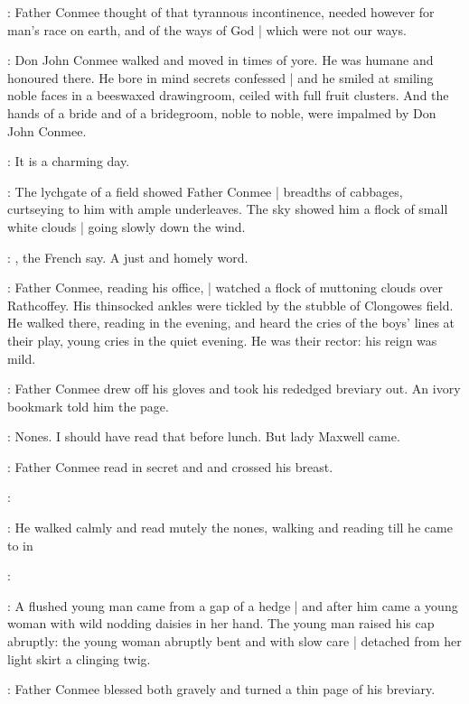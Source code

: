 :
Father Conmee thought of that tyrannous incontinence,
needed however for man's race on earth,
and of the ways of God |
which were not our ways.

:
Don John Conmee walked and moved in times of yore.
He was humane and honoured there.
He bore in mind secrets confessed |
and he smiled at smiling noble faces in a beeswaxed drawingroom,
ceiled with full fruit clusters.
And the hands of a bride and of a bridegroom,
noble to noble,
were impalmed by Don John Conmee.

\conmeeint:
It is a charming day.

:
The lychgate of a field showed Father Conmee |
breadths of cabbages,
curtseying to him with ample underleaves.
The sky showed him a flock of small white clouds |
going slowly down the wind.

\conmeeint:
, the French say.
A just and homely word.

:
Father Conmee, reading his office, |
watched a flock of muttoning clouds over Rathcoffey.
His thinsocked ankles were tickled by the stubble of Clongowes field.
He walked there, reading in the evening,
and heard the cries of the boys' lines at their play,
young cries in the quiet evening.
He was their rector: his reign was mild.

:
Father Conmee drew off his gloves
and took his rededged breviary out.%
An ivory bookmark told him the page.

\conmeeint:
Nones.
I should have read that before lunch.
But lady Maxwell came.

:
Father Conmee read in secret  and 
and crossed his breast.

\conmeeint:

:
He walked calmly and read mutely the nones,
walking and reading till
he came to
 in

\conmeeint:

:
A flushed young man came from a gap of a hedge |
and after him came a young woman
with wild nodding daisies in her hand.%
The young man raised his cap abruptly:
the young woman abruptly bent
and with slow care |
detached from her light skirt a clinging twig.

:
Father Conmee blessed both gravely
and turned a thin page of his breviary.

